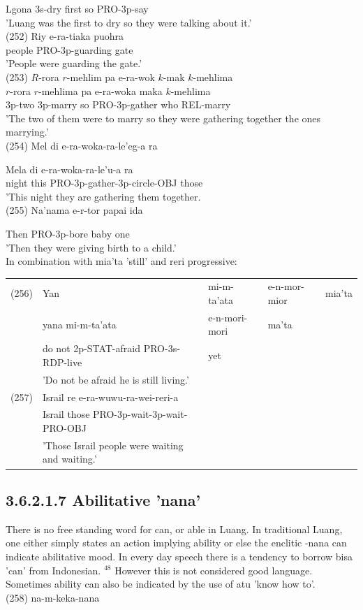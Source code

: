 \documentclass[10pt]{article}
\begin{document}
Lgona 3s-dry first so PRO-3p-say\\
'Luang was the first to dry so they were talking about it.'\\
(252) Riy e-ra-tiaka puohra\\
people PRO-3p-guarding gate\\
'People were guarding the gate.'\\
(253) \(R\)-rora \(r\)-mehlim pa e-ra-wok \(k\)-mak \(k\)-mehlima\\
\(r\)-rora \(r\)-mehlima pa e-ra-woka maka \(k\)-mehlima\\
3p-two 3p-marry so PRO-3p-gather who REL-marry\\
'The two of them were to marry so they were gathering together the ones marrying.'\\
(254) Mel di e-ra-woka-ra-le'eg-a ra

Mela di e-ra-woka-ra-le'u-a ra\\
night this PRO-3p-gather-3p-circle-OBJ those\\
'This night they are gathering them together.\\
(255) Na'nama e-r-tor papai ida

Then PRO-3p-bore baby one\\
'Then they were giving birth to a child.'\\
In combination with mia'ta 'still' and reri progressive:

\begin{center}
\begin{tabular}{lllll}
(256) & Yan & mi-m-ta'ata & e-n-mor-mior & mia'ta \\
 & yana mi-m-ta'ata & e-n-mori-mori & ma'ta &  \\
 & do not 2p-STAT-afraid PRO-3s-RDP-live & yet &  &  \\
 & 'Do not be afraid he is still living.' &  &  &  \\
(257) & Israil re e-ra-wuwu-ra-wei-reri-a &  &  &  \\
 & Israil those PRO-3p-wait-3p-wait-PRO-OBJ &  &  &  \\
 & 'Those Israil people were waiting and waiting.' &  &  &  \\
\end{tabular}
\end{center}

\subsection*{3.6.2.1.7 Abilitative 'nana'}
There is no free standing word for can, or able in Luang. In traditional Luang, one either simply states an action implying ability or else the enclitic -nana can indicate abilitative mood. In every day speech there is a tendency to borrow bisa 'can' from Indonesian. \({ }^{48}\) However this is not considered good language. Sometimes ability can also be indicated by the use of atu 'know how to'.\\
(258) na-m-keka-nana
\end{document}
